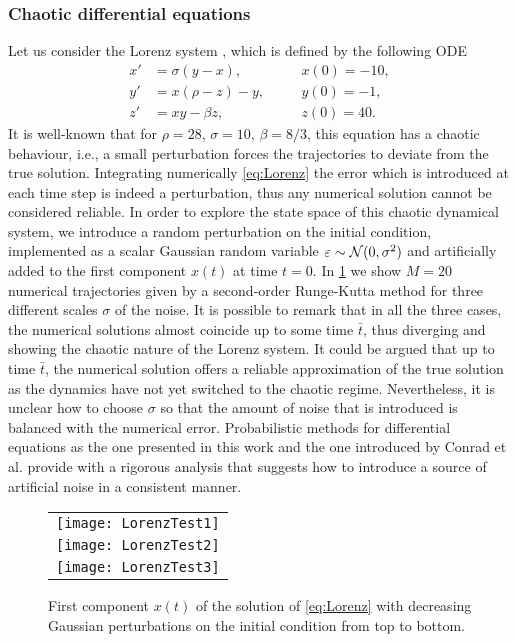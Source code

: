 \documentclass[10pt]{article}
\begin{document}
\subsubsection*{Chaotic differential equations} Let us consider the Lorenz system \cite{Lor63}, which is defined by the following ODE
\begin{equation}\label{eq:Lorenz}
\begin{aligned}
	x' &= \sigma(y - x), \quad &&x(0) = -10,\\
	y' &= x(\rho - z) - y, \quad &&y(0) = -1,\\
	z' &= xy - \beta z, \quad &&z(0) = 40.
\end{aligned}
\end{equation}
It is well-known that for $\rho=28$, $\sigma=10$, $\beta=8/3$, this equation has a chaotic behaviour, i.e., a small perturbation forces the trajectories to deviate from the true solution. Integrating numerically \eqref{eq:Lorenz} the error which is introduced at each time step is indeed a perturbation, thus any numerical solution cannot be considered reliable. In order to explore the state space of this chaotic dynamical system, we introduce a random perturbation on the initial condition, implemented as a scalar Gaussian random variable $\varepsilon \sim \mathcal{N}(0, \sigma^2)$ and artificially added to the first component $x(t)$ at time $t = 0$. In \cref{fig:LorenzTest} we show $M = 20$ numerical trajectories given by a second-order Runge-Kutta method for three different scales $\sigma$ of the noise. It is possible to remark that in all the three cases, the numerical solutions almost coincide up to some time $\bar t$, thus diverging and showing the chaotic nature of the Lorenz system. It could be argued that up to time $\bar t$, the numerical solution offers a reliable approximation of the true solution as the dynamics have not yet switched to the chaotic regime. Nevertheless, it is unclear how to choose $\sigma$ so that the amount of noise that is introduced is balanced with the numerical error. Probabilistic methods for differential equations as the one presented in this work and the one introduced by Conrad et al. \cite{CGS16} provide with a rigorous analysis that suggests how to introduce a source of artificial noise in a consistent manner.
 
\begin{figure}
	\begin{center}
		\begin{tabular}{c}
			\texttt{[image: LorenzTest1]} \\
			\texttt{[image: LorenzTest2]} \\
			\texttt{[image: LorenzTest3]}
		\end{tabular}
	\end{center}
	\caption{First component $x(t)$ of the solution of \eqref{eq:Lorenz} with decreasing Gaussian perturbations on the initial condition from top to bottom.}
	\label{fig:LorenzTest}
\end{figure}
\end{document}
